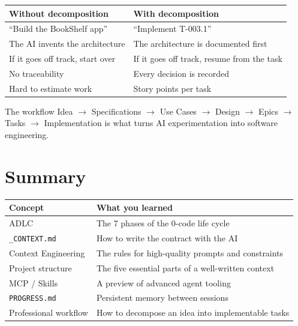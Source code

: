 \begin{center}
\begin{tabularx}{\textwidth}{X X}
\toprule
\textbf{Without decomposition} & \textbf{With decomposition} \\
\midrule
``Build the BookShelf app'' & ``Implement T-003.1'' \\
The AI invents the architecture & The architecture is documented first \\
If it goes off track, start over & If it goes off track, resume from the task \\
No traceability & Every decision is recorded \\
Hard to estimate work & Story points per task \\
\bottomrule
\end{tabularx}
\end{center}

\begin{checkpointbox}
The workflow Idea $\rightarrow$ Specifications $\rightarrow$ Use Cases $\rightarrow$ Design $\rightarrow$ Epics $\rightarrow$ Tasks $\rightarrow$ Implementation is what turns AI experimentation into software engineering.
\end{checkpointbox}

\section*{Summary}

\begin{center}
\begin{tabularx}{\textwidth}{l X}
\toprule
\textbf{Concept} & \textbf{What you learned} \\
\midrule
ADLC & The 7 phases of the 0-code life cycle \\
\texttt{\_CONTEXT.md} & How to write the contract with the AI \\
Context Engineering & The rules for high-quality prompts and constraints \\
Project structure & The five essential parts of a well-written context \\
MCP / Skills & A preview of advanced agent tooling \\
\texttt{PROGRESS.md} & Persistent memory between sessions \\
Professional workflow & How to decompose an idea into implementable tasks \\
\bottomrule
\end{tabularx}
\end{center}
